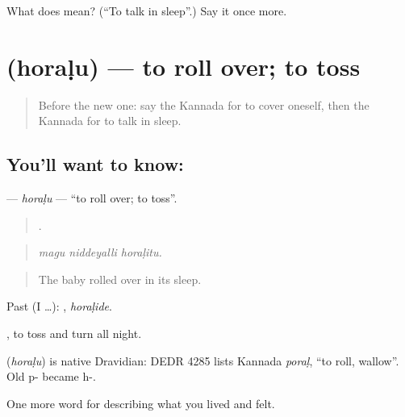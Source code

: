 \begin{tcolorbox}[breakable,colback=teal!4,colframe=teal!35!black,title={Before you move on}]
What does  mean? (\textquotedblleft{}To talk in sleep\textquotedblright{}.) Say it once more.
\end{tcolorbox}
\section[\texorpdfstring{\kn{ಹೊರಳು} (horaḷu)}{ಹೊರಳು (horaḷu)}]{ (horaḷu) — to roll over; to toss}

\label{lesson:KA-C506-horalu}



\begin{quote}
Before the new one: say the Kannada for to cover oneself, then the Kannada for to talk in sleep.
\end{quote}

\subsection*{You'll want to know: }
\textbf{} — \emph{horaḷu} — \textquotedblleft{}to roll over; to toss\textquotedblright{}.

\begin{quote}
  .
\end{quote}

\begin{quote}
\emph{magu niddeyalli horaḷitu.}
\end{quote}

\begin{quote}
The baby rolled over in its sleep.
\end{quote}

Past (I …): , \emph{horaḷide}.

, to toss and turn all night.

\begin{cousinweb}
\textbf{} (\emph{horaḷu}) is native Dravidian: DEDR 4285 lists Kannada \emph{poraḷ}, \textquotedblleft{}to roll, wallow\textquotedblright{}. Old p- became h-.
\end{cousinweb}

\begin{grammarlens}[title={What you've built}]
One more word for describing what you lived and felt.
\end{grammarlens}

